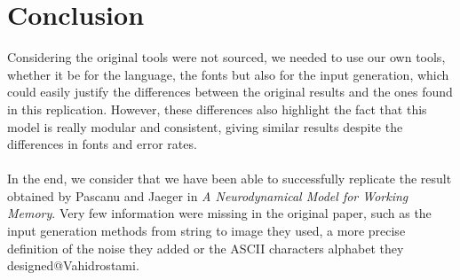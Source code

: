 \section{Conclusion}

Considering the original tools were not sourced, we needed to use our own tools, whether it be for the language, the fonts but also for the input generation, which could easily justify the differences between the original results and the ones found in this replication. However, these differences also highlight the fact that this model is really modular and consistent, giving similar results despite the differences in fonts and error rates. \\
\\
In the end, we consider that we have been able to successfully replicate the result obtained by Pascanu and Jaeger in \textit{A Neurodynamical Model for Working Memory}. 
Very few information were missing in the original paper, such as the input generation methods from string to image they used, a more precise definition of the noise they added or the ASCII characters alphabet they designed@Vahidrostami.
